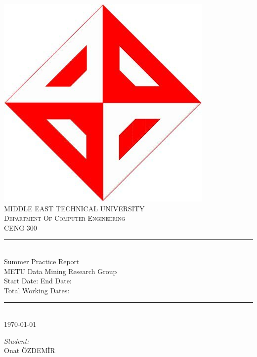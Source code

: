 \documentclass[12pt]{article}
\begin{document}
	\begin{titlepage}
		\newcommand{\HRule}{\rule{\linewidth}{0.1mm}} 
		\center 
		\includegraphics[scale=0.12]{ceng.jpg} \\
		\vspace{1cm}
		\textsc{\Large MIDDLE EAST TECHNICAL UNIVERSITY}\\[0.5cm]
		\textsc{\large Department Of Computer Engineering}\\[0.5cm]
		\textsc{\large CENG 300}\\
		\HRule \\[0.4cm]
		{ \huge \Large Summer Practice Report }\\[0.4cm]
		METU Data Mining Research Group \\
		Start Date: \hspace{25px}  End Date: \\
		Total Working Dates:
		
		\HRule \\[0.3cm]
		{\today}\\[1.2cm]
		
		
		\begin{minipage}{0.4\textwidth}
			\begin{flushleft} \large
				
				\emph{Student:}\\
				Onat ÖZDEMİR
			\end{flushleft}
			

\end{minipage}
\end{titlepage}
\end{document}
